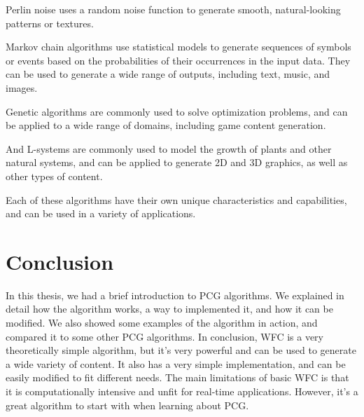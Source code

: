 \documentclass[10pt,oneside,a4paper]{article}
\begin{document}
Perlin noise uses a random noise function to generate smooth, natural-looking patterns or textures\cite{PerNoise}.

Markov chain algorithms use statistical models to generate sequences of symbols or events based on the probabilities of their occurrences in the input data.
They can be used to generate a wide range of outputs, including text, music, and images\cite{MCHAIN}.

Genetic algorithms are commonly used to solve optimization problems, and can be applied to a wide range of domains, including game content generation\cite{GeneticAA}.

And L-systems are commonly used to model the growth of plants and other natural systems, and can be applied to generate 2D and 3D graphics, as well as other types of content\cite{LSys}.

Each of these algorithms have their own unique characteristics and capabilities, and can be used in a variety of applications.

\section{Conclusion}\label{sec:conclusion}
In this thesis, we had a brief introduction to PCG algorithms.
We explained in detail how the algorithm works, a way to implemented it, and how it can be modified.
We also showed some examples of the algorithm in action, and compared it to some other PCG algorithms.
In conclusion, WFC is a very theoretically simple algorithm, but it's very powerful and can be used to generate a wide variety of content.
It also has a very simple implementation, and can be easily modified to fit different needs.
The main limitations of basic WFC is that it is computationally intensive and unfit for real-time applications. 
However, it's a great algorithm to start with when learning about PCG\@.



\end{document}

